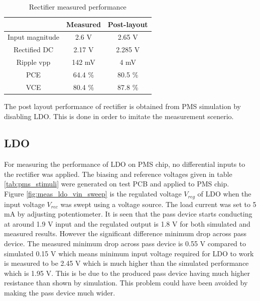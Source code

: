 \documentclass[12pt,a4paper,UKenglish]{report}
\begin{document}
\begin{table}[H]
\caption{Rectifier measured performance}
\begin{center}
\begin{tabular}{c|c|c}
\hline \hline
				 & \textbf{Measured}		& \textbf{Post-layout} \\
\hline \hline
Input magnitude 	& 2.6 V 			&	2.65 V	\\ \hline
Rectified DC	 	& 2.17 V 				& 2.285 V	\\ \hline
Ripple \acrshort{vpp} & 142 mV 				& 4 mV	\\ \hline
PCE 				& 64.4 \% 				&	80.5 \%	\\ \hline
VCE 				& 80.4 \% 				&	87.8 \%	\\
\hline \hline
\end{tabular}
\end{center}
\label{tab:rect_spec_meas}
\end{table}

The post layout performance of rectifier is obtained from PMS simulation by disabling LDO. This is done in order to imitate 
the measurement scenerio.

\subsection{LDO} %

For measuring the performance of LDO on PMS chip, no differential inputs to the rectifier was applied. The biasing and reference 
voltages given in table \ref{tab:pms_stimuli} were generated on test PCB and applied to PMS chip. \\

Figure \ref{fig:meas_ldo_vin_sweep} is the regulated voltage $V_{reg}$ of LDO when the input voltage $V_{rec}$ was swept using a voltage source. 
The load current was set to 5 mA by adjusting potentiometer. It is seen that the pass device starts conducting at around 
1.9 V input and the regulated output is 1.8 V for both simulated and measured results. However the significant difference 
minimum drop across pass device. The measured minimum drop across pass device is 0.55 V compared to simulated 0.15 V which 
means minimum input voltage required for LDO to work is measured to be 2.45 V which is much higher than the simulated 
performance which is 1.95 V. This is be due to the produced pass device having much higher resistance than shown by 
simulation. This problem could have been avoided by making the pass device much wider. \\
\end{document}
